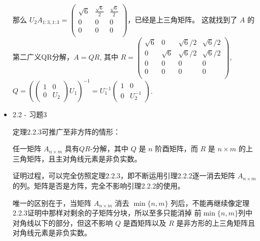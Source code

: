 \documentclass{article}
\begin{document}
\begin{spacing}{1.5}
\begin{itemize}
    那么 $U_2A_{1:3, 1:3} = \left(
        \begin{array}{ccc}
            \sqrt{6} & \frac{\sqrt{6}}{2} & \frac{\sqrt{6}}{2}\\
            0 & 0 & 0\\
            0 & 0 & 0\\
        \end{array}
    \right)$，已经是上三角矩阵。
    这就找到了 $A$ 的第二广义QR分解，$A=QR$, 其中 
    $R = \left(\begin{array}{cccc}
        \sqrt{6} & 0 & \sqrt{6}/2 & \sqrt{6}/2\\
        0 & \sqrt{6} & \sqrt{6}/2 & \sqrt{6}/2\\
        0 & 0 & 0 & 0\\
        0 & 0 & 0 & 0\\
    \end{array}\right) $, $Q = \left(\left(\begin{array}{cc}1&0\\0&U_2\end{array}\right)U_1\right)^{-1} = U_1^{-1}\left(\begin{array}{cc}1&0\\0&U_2^{-1}\end{array}\right)$.
    
    \item 2.2 - 习题3
    
    定理2.2.3可推广至非方阵的情形：

    任一矩阵 $A_{n\times m}$ 具有$QR$-分解，其中 $Q$ 是 $n$ 阶酉矩阵，而 $R$ 是 $n\times m$ 的上三角矩阵，且主对角线元素是非负实数。

    证明过程，可以完全仿照定理2.2.3，即不断运用引理2.2.2逐一消去矩阵 $A_{n\times m}$ 的列。矩阵是否是方阵，完全不影响引理2.2.2的使用。

    唯一的区别在于，当矩阵 $A_{n\times m}$ 消去 $\min\{n,m\}$ 列后，不能再继续像定理2.2.3证明中那样对剩余的子矩阵分块，所以至多只能消掉
    前$\min\{n,m\}$列中对角线以下的部分，但这不影响 $Q$ 是酉矩阵以及 $R$ 是非方形的上三角矩阵且对角线元素是非负实数。

\end{itemize}
\end{spacing}
\end{document}
